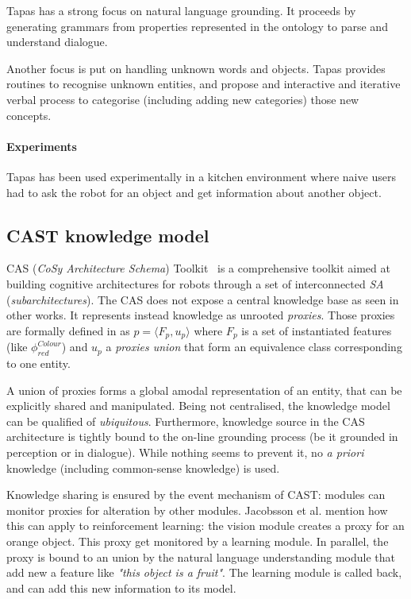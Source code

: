 \documentclass[a4paper, twocolumn]{article}
\begin{document}
{\sc Tapas} has a strong focus on natural language grounding. It proceeds by
generating grammars from properties represented in the ontology to parse and
understand dialogue.

Another focus is put on handling unknown words and objects. {\sc Tapas}
provides routines to recognise unknown entities, and propose and interactive
and iterative verbal process to categorise (including adding new categories)
those new concepts.

\paragraph{Experiments} {\sc Tapas} has been used experimentally in a kitchen
environment where naive users had to ask the robot for an object and get
information about another object.

\subsection{CAST knowledge model}
\label{sect|cast}

CAS (\emph{CoSy Architecture Schema}) Toolkit~\cite{Hawes2007} is a
comprehensive toolkit aimed at building cognitive architectures for robots
through a set of interconnected \emph{SA} (\emph{subarchitectures}). The CAS
does not expose a central knowledge base as seen in other works. It represents
instead knowledge as unrooted \emph{proxies}. Those proxies are formally
defined in \cite{Jacobsson2008} as $p= \langle F_p, u_p \rangle$ where $F_p$ is
a set of instantiated features (like $\phi^{Colour}_{red}$) and $u_p$ a
\emph{proxies union} that form an equivalence class corresponding to one
entity.

A union of proxies forms a global amodal representation of an entity, that can
be explicitly shared and manipulated. Being not centralised, the knowledge
model can be qualified of \emph{ubiquitous}. Furthermore, knowledge source in
the CAS architecture is tightly bound to the on-line grounding process (be it
grounded in perception or in dialogue). While nothing seems to prevent it, no
{\it a priori} knowledge (including common-sense knowledge) is used.

Knowledge sharing is ensured by the event mechanism of CAST: modules can
monitor proxies for alteration by other modules. Jacobsson et al. mention how
this can apply to reinforcement learning: the vision module creates a proxy for
an orange object. This proxy get monitored by a learning module. In parallel,
the proxy is bound to an union by the natural language understanding module
that add new a feature like \emph{"this object is a fruit"}. The learning
module is called back, and can add this new information to its model.
\end{document}
